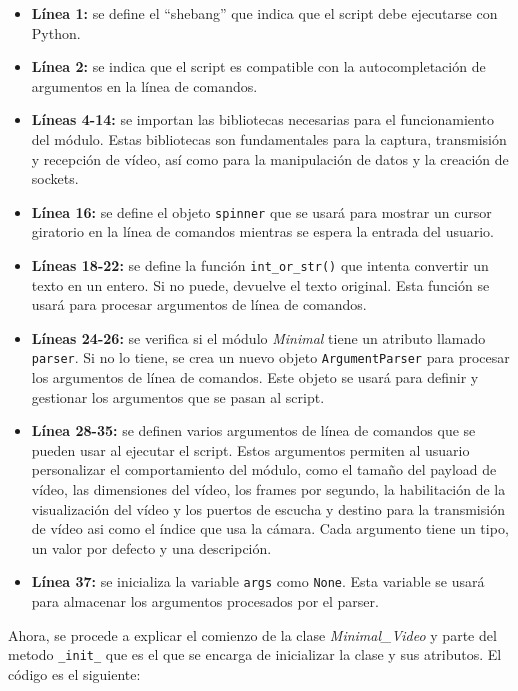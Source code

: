 \begin{itemize}
    \item \textbf{Línea 1:} se define el ``shebang'' que indica que el script debe ejecutarse con Python.
    \item \textbf{Línea 2:} se indica que el script es compatible con la autocompletación de argumentos en la línea de comandos.
    \item \textbf{Líneas 4-14:} se importan las bibliotecas necesarias para el funcionamiento del módulo. Estas bibliotecas son fundamentales para la captura, transmisión y recepción de vídeo, así como para la manipulación de datos y la creación de sockets.
    \item \textbf{Línea 16:} se define el objeto \texttt{spinner} que se usará para mostrar un cursor giratorio en la línea de comandos mientras se espera la entrada del usuario.
    \item \textbf{Líneas 18-22:} se define la función \texttt{int\_or\_str()} que intenta convertir un texto en un entero. Si no puede, devuelve el texto original. Esta función se usará para procesar argumentos de línea de comandos.
    \item \textbf{Líneas 24-26:} se verifica si el módulo \textit{Minimal} tiene un atributo llamado \texttt{parser}. Si no lo tiene, se crea un nuevo objeto \texttt{ArgumentParser} para procesar los argumentos de línea de comandos. Este objeto se usará para definir y gestionar los argumentos que se pasan al script.
    \item \textbf{Línea 28-35:} se definen varios argumentos de línea de comandos que se pueden usar al ejecutar el script. Estos argumentos permiten al usuario personalizar el comportamiento del módulo, como el tamaño del payload de vídeo, las dimensiones del vídeo, los frames por segundo, la habilitación de la visualización del vídeo y los puertos de escucha y destino para la transmisión de vídeo asi como el índice que usa la cámara. Cada argumento tiene un tipo, un valor por defecto y una descripción.
    \item \textbf{Línea 37:} se inicializa la variable \texttt{args} como \texttt{None}. Esta variable se usará para almacenar los argumentos procesados por el parser.
\end{itemize}

\vspace{\baselineskip}

Ahora, se procede a explicar el comienzo de la clase \textit{Minimal\_Video} y parte del metodo \texttt{\_init\_} que es el que se encarga de inicializar la clase y sus atributos. El código es el siguiente:

